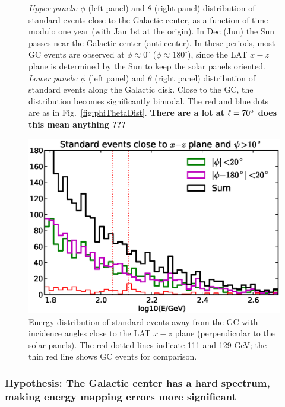 \documentclass[aps,twocolumn,prd,superscriptaddress,showpacs,nofootinbib,fixfloat]{revtex4}
\newcommand{\degree}{^{\rm o}}
\begin{document}
\begin{figure}
  \caption{\emph{Upper panels:} $\phi$ (left panel) and
  $\theta$ (right panel) distribution of standard events
  close to the Galactic center, as a function of time modulo
  one year (with Jan 1st at the origin). In Dec (Jun) the
  Sun passes near the Galactic center (anti-center).  In
  these periods, most GC events are observed at $\phi\approx
  0^\circ$ ($\phi\approx 180^\circ$), since the LAT $x-z$
  plane is determined by the Sun to keep the solar panels
  oriented. \emph{Lower panels:} $\phi$ (left panel) and
  $\theta$ (right panel) distribution of standard events
  along the Galactic disk. Close to the GC, the distribution
  becomes significantly bimodal. The red and blue dots are
  as in Fig.~\ref{fig:phiThetaDist}.  {\bf  There are a lot at $\ell=70\degree$ does
    this mean anything ???}}
  \label{fig:time_phi}
\end{figure}

\begin{figure}
  \centering
  \includegraphics[width=1.0\linewidth]{plots/phi_energy.eps}
  \caption{Energy distribution of standard events away from the GC with
  incidence angles close to the LAT $x-z$ plane (perpendicular to the solar
  panels). The red dotted lines indicate 111 and 129 GeV; the thin red line
  shows GC events for comparison.}
  \label{fig:spectrum_phi}
\end{figure}

\subsubsection{Hypothesis: The Galactic
center has a hard spectrum, making energy mapping errors more
significant}
\end{document}
